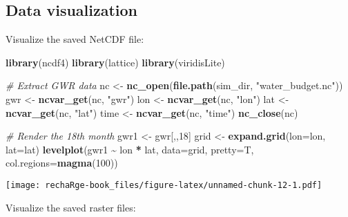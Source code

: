 \documentclass[
]{book}
\newenvironment{Shaded}{\begin{snugshade}}{\end{snugshade}}
\newcommand{\AttributeTok}[1]{\textcolor[rgb]{0.13,0.29,0.53}{#1}}
\newcommand{\CommentTok}[1]{\textcolor[rgb]{0.56,0.35,0.01}{\textit{#1}}}
\newcommand{\DecValTok}[1]{\textcolor[rgb]{0.00,0.00,0.81}{#1}}
\newcommand{\FunctionTok}[1]{\textcolor[rgb]{0.13,0.29,0.53}{\textbf{#1}}}
\newcommand{\NormalTok}[1]{#1}
\newcommand{\OtherTok}[1]{\textcolor[rgb]{0.56,0.35,0.01}{#1}}
\newcommand{\SpecialCharTok}[1]{\textcolor[rgb]{0.81,0.36,0.00}{\textbf{#1}}}
\newcommand{\StringTok}[1]{\textcolor[rgb]{0.31,0.60,0.02}{#1}}
\begin{document}
\hypertarget{data-visualization}{%
\subsection{Data visualization}\label{data-visualization}}

Visualize the saved NetCDF file:

\begin{Shaded}
\begin{Highlighting}[]
\FunctionTok{library}\NormalTok{(ncdf4)}
\FunctionTok{library}\NormalTok{(lattice)}
\FunctionTok{library}\NormalTok{(viridisLite)}

\CommentTok{\# Extract GWR data}
\NormalTok{nc }\OtherTok{\textless{}{-}} \FunctionTok{nc\_open}\NormalTok{(}\FunctionTok{file.path}\NormalTok{(sim\_dir, }\StringTok{"water\_budget.nc"}\NormalTok{))}
\NormalTok{gwr }\OtherTok{\textless{}{-}} \FunctionTok{ncvar\_get}\NormalTok{(nc, }\StringTok{"gwr"}\NormalTok{)}
\NormalTok{lon }\OtherTok{\textless{}{-}} \FunctionTok{ncvar\_get}\NormalTok{(nc, }\StringTok{"lon"}\NormalTok{)}
\NormalTok{lat }\OtherTok{\textless{}{-}} \FunctionTok{ncvar\_get}\NormalTok{(nc, }\StringTok{"lat"}\NormalTok{)}
\NormalTok{time }\OtherTok{\textless{}{-}} \FunctionTok{ncvar\_get}\NormalTok{(nc, }\StringTok{"time"}\NormalTok{)}
\FunctionTok{nc\_close}\NormalTok{(nc)}

\CommentTok{\# Render the 18th month}
\NormalTok{gwr1 }\OtherTok{\textless{}{-}}\NormalTok{ gwr[,,}\DecValTok{18}\NormalTok{]}
\NormalTok{grid }\OtherTok{\textless{}{-}} \FunctionTok{expand.grid}\NormalTok{(}\AttributeTok{lon=}\NormalTok{lon, }\AttributeTok{lat=}\NormalTok{lat)}
\FunctionTok{levelplot}\NormalTok{(gwr1 }\SpecialCharTok{\textasciitilde{}}\NormalTok{ lon }\SpecialCharTok{*}\NormalTok{ lat, }\AttributeTok{data=}\NormalTok{grid, }\AttributeTok{pretty=}\NormalTok{T, }\AttributeTok{col.regions=}\FunctionTok{magma}\NormalTok{(}\DecValTok{100}\NormalTok{))}
\end{Highlighting}
\end{Shaded}

\texttt{[image: rechaRge-book\_files/figure-latex/unnamed-chunk-12-1.pdf]}

Visualize the saved raster files:
\end{document}
